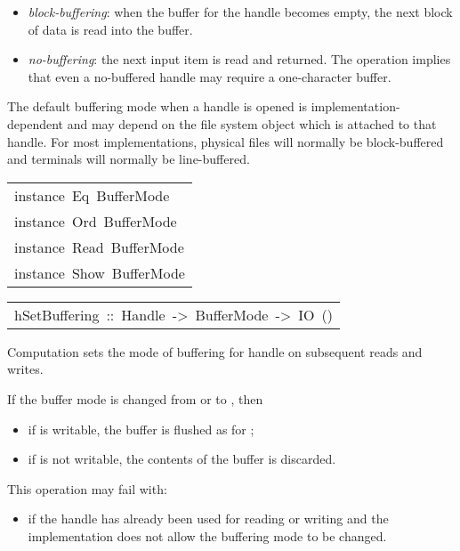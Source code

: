 \begin{haddockdesc}
\begin{itemize}
\item
 \emph{block-buffering}: when the buffer for the handle becomes empty,
    the next block of data is read into the buffer.
\par

\item
 \emph{no-buffering}: the next input item is read and returned.
    The  operation implies that even a no-buffered
    handle may require a one-character buffer.
\par

\end{itemize}
The default buffering mode when a handle is opened is
 implementation-dependent and may depend on the file system object
 which is attached to that handle.
 For most implementations, physical files will normally be block-buffered 
 and terminals will normally be line-buffered.
\par

\end{haddockdesc}
\begin{haddockdesc}
\item[\begin{tabular}{@{}l}
instance\ Eq\ BufferMode\\instance\ Ord\ BufferMode\\instance\ Read\ BufferMode\\instance\ Show\ BufferMode
\end{tabular}]
\end{haddockdesc}
\begin{haddockdesc}
\item[\begin{tabular}{@{}l}
hSetBuffering\ ::\ Handle\ ->\ BufferMode\ ->\ IO\ ()
\end{tabular}]\haddockbegindoc
Computation   sets the mode of buffering for
 handle  on subsequent reads and writes.
\par
If the buffer mode is changed from  or
  to , then
\par
\begin{itemize}
\item
 if  is writable, the buffer is flushed as for ;
\par

\item
 if  is not writable, the contents of the buffer is discarded.
\par

\end{itemize}
This operation may fail with:
\par
\begin{itemize}
\item
  if the handle has already been used for reading
    or writing and the implementation does not allow the buffering mode
    to be changed.
\par

\end{itemize}

\end{haddockdesc}
